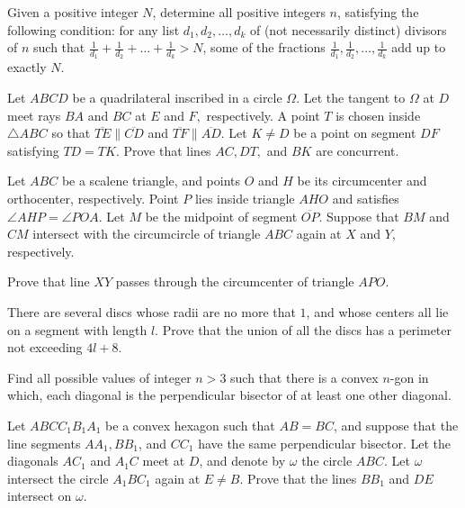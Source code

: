 \documentclass[11pt]{scrartcl}
\begin{document}
\begin{problem}[7431104394604748426]
Given a positive integer $N$, determine all positive integers $n$, satisfying the following condition: for any list $d_1,d_2,\ldots,d_k$ of (not necessarily distinct) divisors of $n$ such that $\frac{1}{d_1} + \frac{1}{d_2} + \ldots + \frac{1}{d_k} > N$, some of the fractions $\frac{1}{d_1}, \frac{1}{d_2}, \ldots, \frac{1}{d_k}$ add up to exactly $N$.
\end{problem}
\begin{problem}[8851048763094130212]
	Let $ABCD$ be a quadrilateral inscribed in a circle $\Omega.$ Let the tangent to $\Omega$ at $D$ meet rays $BA$ and $BC$ at $E$ and $F,$ respectively. A point $T$ is chosen inside $\triangle ABC$ so that $\overline{TE}\parallel\overline{CD}$ and $\overline{TF}\parallel\overline{AD}.$ Let $K\ne D$ be a point on segment $DF$ satisfying $TD=TK.$ Prove that lines $AC,DT,$ and $BK$ are concurrent.
\end{problem}
\begin{problem}[8053761138620448460]
	Let $ABC$ be a scalene triangle, and points $O$ and $H$ be its circumcenter and orthocenter, respectively. Point $P$ lies inside triangle $AHO$ and satisfies $\angle AHP = \angle POA$. Let $M$ be the midpoint of segment $\overline{OP}$. Suppose that $BM$ and $CM$ intersect with the circumcircle of triangle $ABC$ again at $X$ and $Y$, respectively.

Prove that line $XY$ passes through the circumcenter of triangle $APO$.
\end{problem}
\begin{problem}[6851509563331617580]
There are several discs whose radii are no more that $1$, and whose centers all lie on a segment with length ${l}$. Prove that the union of all the discs has a perimeter not exceeding $4l+8$.
\end{problem}
\begin{problem}[9156814072173030162]
Find all possible values of integer $n > 3$ such that there is a convex $n$-gon in which, each diagonal is the perpendicular bisector of at least one other diagonal.
\end{problem}
\begin{problem}[876239022447910]
	Let $ABCC_1B_1A_1$ be a convex hexagon such that $AB=BC$, and suppose that the line segments $AA_1, BB_1$, and $CC_1$ have the same perpendicular bisector. Let the diagonals $AC_1$ and $A_1C$ meet at $D$, and denote by $\omega$ the circle $ABC$. Let $\omega$ intersect the circle $A_1BC_1$ again at $E \neq B$. Prove that the lines $BB_1$ and $DE$ intersect on $\omega$.
\end{problem}
\end{document}

